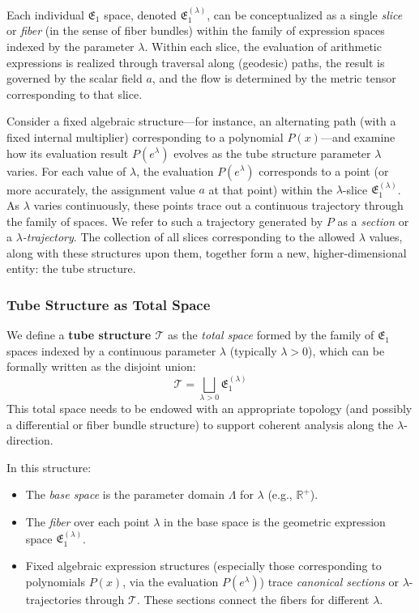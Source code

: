\documentclass[12pt]{article}
\begin{document}
Each individual $\mathfrak{E}_1$ space, denoted $\mathfrak{E}_1^{(\lambda)}$, can be conceptualized as a single \emph{slice} or \emph{fiber} (in the sense of fiber bundles) within the family of expression spaces indexed by the parameter $\lambda$. Within each slice, the evaluation of arithmetic expressions is realized through traversal along (geodesic) paths, the result is governed by the scalar field $a$, and the flow is determined by the metric tensor corresponding to that slice.

Consider a fixed algebraic structure—for instance, an alternating path (with a fixed internal multiplier) corresponding to a polynomial $P(x)$—and examine how its evaluation result $P(e^\lambda)$ evolves as the tube structure parameter $\lambda$ varies. For each value of $\lambda$, the evaluation $P(e^\lambda)$ corresponds to a point (or more accurately, the assignment value $a$ at that point) within the $\lambda$-slice $\mathfrak{E}_1^{(\lambda)}$. As $\lambda$ varies continuously, these points trace out a continuous trajectory through the family of spaces. We refer to such a trajectory generated by $P$ as a \emph{section} or a \emph{$\lambda$-trajectory}. The collection of all slices corresponding to the allowed $\lambda$ values, along with these structures upon them, together form a new, higher-dimensional entity: the tube structure.

\subsubsection{Tube Structure as Total Space}\label{subsec:tube_total_space-full}

We define a \textbf{tube structure $\mathcal{T}$} as the \emph{total space} formed by the family of $\mathfrak{E}_1$ spaces indexed by a continuous parameter $\lambda$ (typically $\lambda > 0$), which can be formally written as the disjoint union:
\begin{equation}
\mathcal{T} = \bigsqcup_{\lambda > 0} \mathfrak{E}_1^{(\lambda)}
\end{equation}
This total space needs to be endowed with an appropriate topology (and possibly a differential or fiber bundle structure) to support coherent analysis along the $\lambda$-direction.

In this structure:
\begin{itemize}
    \item The \emph{base space} is the parameter domain $\Lambda$ for $\lambda$ (e.g., $\mathbb{R}^+$).
    \item The \emph{fiber} over each point $\lambda$ in the base space is the geometric expression space $\mathfrak{E}_1^{(\lambda)}$.
    \item Fixed algebraic expression structures (especially those corresponding to polynomials $P(x)$, via the evaluation $P(e^\lambda)$) trace \emph{canonical sections} or $\lambda$-trajectories through $\mathcal{T}$. These sections connect the fibers for different $\lambda$.
\end{itemize}
\end{document}
